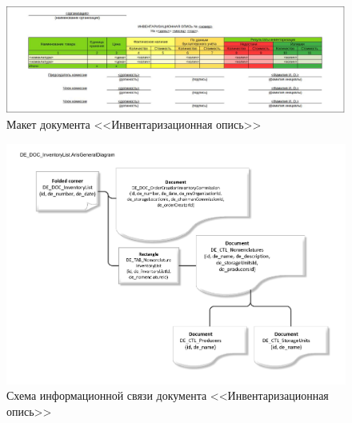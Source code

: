 
\begin{figure}[!h]
    \centering

    \includegraphics[width=18cm]
    {assets/layouts/DOC_InventOpis'.jpg}

    \caption{Макет документа <<Инвентаризационная опись>>}

    \label{fig:DOC_InventOpis}
\end{figure}

\begin{figure}[!h]
    \centering

    \includegraphics[width=18cm]
    {assets/ARIS/GeneralDiagram/DE_DOC_InventoryList.ArisGeneralDiagram.pdf}

    \caption{Схема информационной связи документа <<Инвентаризационная опись>>}

    \label{fig:GeneralDiagram_DE_DOC_InventoryList}
\end{figure}

